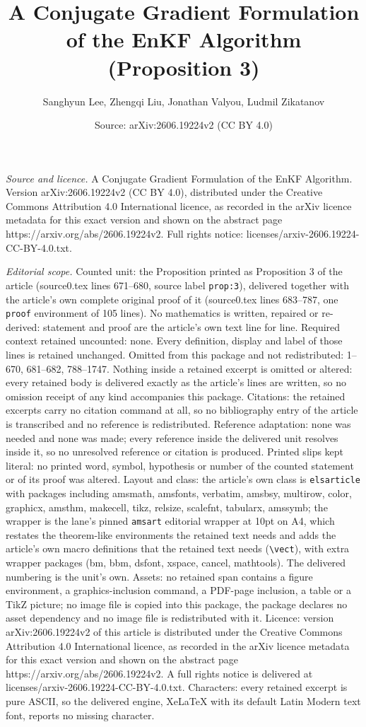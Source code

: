 \documentclass[10pt,a4paper]{amsart}
\title[A Conjugate Gradient Formulation of the EnKF Algorithm]{A Conjugate Gradient Formulation of the EnKF Algorithm (Proposition 3)}
\author{Sanghyun Lee, Zhengqi Liu, Jonathan Valyou, Ludmil Zikatanov}
\date{Source: arXiv:2606.19224v2 (CC BY 4.0)}
\begin{document}
\maketitle

\noindent\emph{Source and licence.} A Conjugate Gradient Formulation of the EnKF Algorithm. Version arXiv:2606.19224v2 (CC BY 4.0), distributed under the Creative Commons Attribution 4.0 International licence, as recorded in the arXiv licence metadata for this exact version and shown on the abstract page https://arxiv.org/abs/2606.19224v2. Full rights notice: licenses/arxiv-2606.19224-CC-BY-4.0.txt.\par\smallskip

\noindent\textit{Editorial scope.} Counted unit: the Proposition printed as Proposition 3 of the article (source0.tex lines 671--680, source label \texttt{prop:3}), delivered together with the article's own complete original proof of it (source0.tex lines 683--787, one \texttt{proof} environment of 105 lines). No mathematics is written, repaired or re-derived: statement and proof are the article's own text line for line. Required context retained uncounted: none. Every definition, display and label of those lines is retained unchanged. Omitted from this package and not redistributed: 1--670, 681--682, 788--1747. Nothing inside a retained excerpt is omitted or altered: every retained body is delivered exactly as the article's lines are written, so no omission receipt of any kind accompanies this package. Citations: the retained excerpts carry no citation command at all, so no bibliography entry of the article is transcribed and no reference is redistributed. Reference adaptation: none was needed and none was made; every reference inside the delivered unit resolves inside it, so no unresolved reference or citation is produced. Printed slips kept literal: no printed word, symbol, hypothesis or number of the counted statement or of its proof was altered. Layout and class: the article's own class is \texttt{elsarticle} with packages including amsmath, amsfonts, verbatim, amsbsy, multirow, color, graphicx, amsthm, makecell, tikz, relsize, scalefnt, tabularx, amssymb; the wrapper is the lane's pinned \texttt{amsart} editorial wrapper at 10pt on A4, which restates the theorem-like environments the retained text needs and adds the article's own macro definitions that the retained text needs (\texttt{\textbackslash vect}), with extra wrapper packages (bm, bbm, dsfont, xspace, cancel, mathtools). The delivered numbering is the unit's own. Assets: no retained span contains a figure environment, a graphics-inclusion command, a PDF-page inclusion, a table or a TikZ picture; no image file is copied into this package, the package declares no asset dependency and no image file is redistributed with it. Licence: version arXiv:2606.19224v2 of this article is distributed under the Creative Commons Attribution 4.0 International licence, as recorded in the arXiv licence metadata for this exact version and shown on the abstract page https://arxiv.org/abs/2606.19224v2. A full rights notice is delivered at licenses/arxiv-2606.19224-CC-BY-4.0.txt. Characters: every retained excerpt is pure ASCII, so the delivered engine, XeLaTeX with its default Latin Modern text font, reports no missing character.
\end{document}
